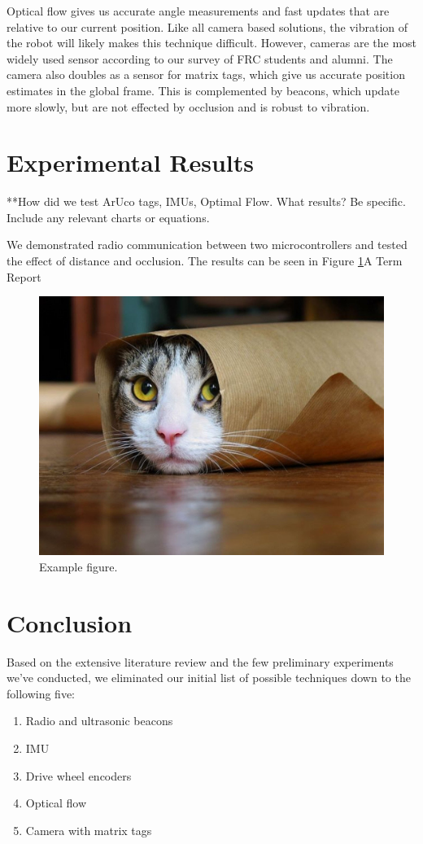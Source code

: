 \documentclass{article}
\begin{document}
Optical flow gives us accurate angle measurements and fast updates that are relative to our current position. Like all camera based solutions, the vibration of the robot will likely makes this technique difficult. However, cameras are the most widely used sensor according to our survey of FRC students and alumni.
The camera also doubles as a sensor for matrix tags, which give us accurate position estimates in the global frame. This is complemented by beacons, which update more slowly, but are not effected by occlusion and is robust to vibration.

\section{Experimental Results} \label{experiments}

**How did we test ArUco tags, IMUs, Optimal Flow. What results? Be specific. Include any relevant charts or equations.

We demonstrated radio communication between two microcontrollers and tested the effect of distance and occlusion. The results can be seen in Figure \ref{fig:example}{A Term Report}


\begin{figure}
  \centering
  \includegraphics[width=0.5\linewidth]{example.jpg}
  \caption{Example figure.}
  \label{fig:example}
\end{figure}


\section{Conclusion} \label{conclusion}

Based on the extensive literature review and the few preliminary experiments we've conducted, we eliminated our initial list of possible techniques down to the following five:
\begin{enumerate}
    \item Radio and ultrasonic beacons
    \item IMU
    \item Drive wheel encoders
    \item Optical flow
    \item Camera with matrix tags
\end{enumerate}
\end{document}
